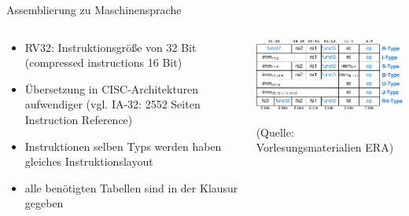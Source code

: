 \documentclass[
  german,            %
  aspectratio=169,    %
]{tumbeamer}
\begin{document}
\begin{frame}[c, fragile]{Assemblierung zu Maschinensprache}{}
	\begin{columns}[c]
		\begin{column}{0.5\textwidth}
			\begin{itemize}
				\item RV32: Instruktionsgröße von 32 Bit (compressed instructions 16 Bit)
				\item Übersetzung in CISC-Architekturen aufwendiger (vgl. IA-32: 2552 Seiten Instruction Reference)
				\item Instruktionen selben Typs werden haben gleiches Instruktionslayout
				\item alle benötigten Tabellen sind in der Klausur gegeben
			\end{itemize}
		\end{column}
		\begin{column}{0.5\textwidth}
			\begin{center}
				\includegraphics[width=\textwidth]{w08_risc_v_types.pdf}\\
			\end{center}
			\centering
			\tiny (Quelle: Vorlesungsmaterialien ERA)
		\end{column}
	\end{columns}
\end{frame}
\end{document}

